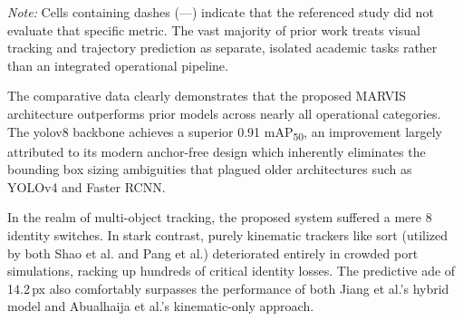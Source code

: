 \begin{table}[H]
\fontsize{9}{11}\selectfont
\centering
\caption{Comprehensive comparison of the proposed system with prior works}
\label{c5:tab:comparison}
\vspace{2mm}
\footnotesize{\textit{Note:} Cells containing dashes (---) indicate that the referenced study did not evaluate that specific metric. The vast majority of prior work treats visual tracking and trajectory prediction as separate, isolated academic tasks rather than an integrated operational pipeline.}


\end{table}

The comparative data clearly demonstrates that the proposed MARVIS architecture outperforms prior models across nearly all operational categories. The \gls{yolov8} backbone achieves a superior 0.91 mAP\textsubscript{50}, an improvement largely attributed to its modern anchor-free design which inherently eliminates the bounding box sizing ambiguities that plagued older architectures such as YOLOv4 and Faster RCNN.

In the realm of multi-object tracking, the proposed system suffered a mere 8 identity switches. In stark contrast, purely kinematic trackers like \gls{sort} (utilized by both Shao et al. and Pang et al.) deteriorated entirely in crowded port simulations, racking up hundreds of critical identity losses. The predictive \gls{ade} of 14.2\,px also comfortably surpasses the performance of both Jiang et al.'s hybrid model and Abualhaija et al.'s kinematic-only approach.

